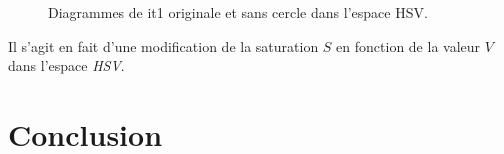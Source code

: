 \documentclass[a4paper,11pt]{article}
\begin{document}
\begin{figure}[H]
  \begin{center}  
    \caption{Diagrammes de it1 originale et sans cercle dans 
    l’espace HSV.}
  \end{center}
\end{figure}

Il s'agit en fait d'une modification de la saturation $S$ en fonction 
de la valeur $V$ dans l'espace \textit{HSV}.

\section*{Conclusion}
\end{document}

